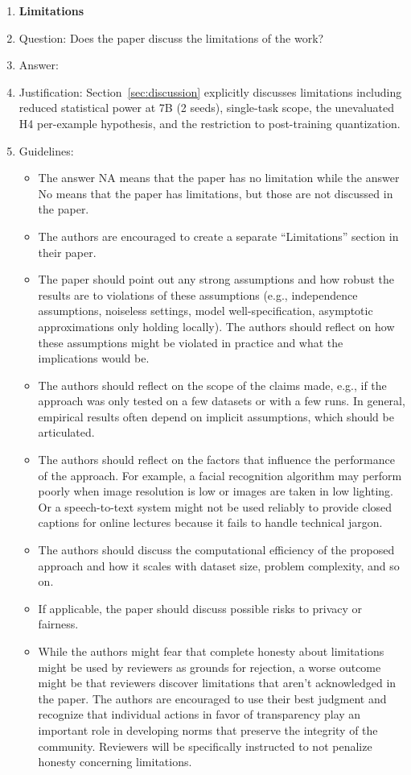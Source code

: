 \documentclass{article}
\begin{document}
\begin{enumerate}
\item {\bf Limitations}
\item[] Question: Does the paper discuss the limitations of the work?
\item[] Answer: \answerYes{}
\item[] Justification: Section~\ref{sec:discussion} explicitly discusses limitations including reduced statistical power at 7B (2 seeds), single-task scope, the unevaluated H4 per-example hypothesis, and the restriction to post-training quantization.
\item[] Guidelines:
\begin{itemize}
    \item The answer NA means that the paper has no limitation while the answer No means that the paper has limitations, but those are not discussed in the paper.
    \item The authors are encouraged to create a separate ``Limitations'' section in their paper.
    \item The paper should point out any strong assumptions and how robust the results are to violations of these assumptions (e.g., independence assumptions, noiseless settings, model well-specification, asymptotic approximations only holding locally). The authors should reflect on how these assumptions might be violated in practice and what the implications would be.
    \item The authors should reflect on the scope of the claims made, e.g., if the approach was only tested on a few datasets or with a few runs. In general, empirical results often depend on implicit assumptions, which should be articulated.
    \item The authors should reflect on the factors that influence the performance of the approach. For example, a facial recognition algorithm may perform poorly when image resolution is low or images are taken in low lighting. Or a speech-to-text system might not be used reliably to provide closed captions for online lectures because it fails to handle technical jargon.
    \item The authors should discuss the computational efficiency of the proposed approach and how it scales with dataset size, problem complexity, and so on.
    \item If applicable, the paper should discuss possible risks to privacy or fairness.
    \item While the authors might fear that complete honesty about limitations might be used by reviewers as grounds for rejection, a worse outcome might be that reviewers discover limitations that aren't acknowledged in the paper. The authors are encouraged to use their best judgment and recognize that individual actions in favor of transparency play an important role in developing norms that preserve the integrity of the community. Reviewers will be specifically instructed to not penalize honesty concerning limitations.
\end{itemize}


\end{enumerate}
\end{document}
